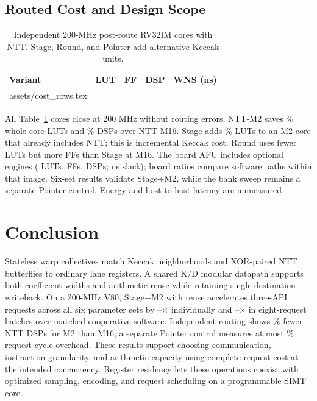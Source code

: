 \documentclass[conference,letterpaper]{IEEEtran}
\makeatletter
\newcommand{\tablerows}[1]{\@@input #1 }
\makeatother
\begin{document}
\subsection{Routed Cost and Design Scope}
\begin{table}[t]
\caption{Independent 200-MHz post-route RV32IM cores with NTT.
Stage, Round, and Pointer add alternative Keccak units.}
\label{tab:cost}
\centering\footnotesize\setlength{\tabcolsep}{3.4pt}
\begin{tabular}{@{}lrrrr@{}}
\toprule
Variant & LUT & FF & DSP & WNS (ns)\\
\midrule
\tablerows{assets/cost_rows.tex}
\bottomrule
\end{tabular}
\end{table}
All Table~\ref{tab:cost} cores close at 200 MHz without routing errors.
NTT-M2 saves \BankTwoCoreLutSaved{}\% whole-core LUTs and
\BankTwoCoreDspSaved{}\% DSPs over NTT-M16. Stage adds \JointStageLutPct{}\% LUTs
to an M2 core that already includes NTT; this is incremental Keccak cost.
Round uses fewer LUTs but more FFs than Stage at M16. The board AFU includes
optional engines (\BoardAfuLuts{} LUTs, \BoardAfuFfs{} FFs,
\BoardAfuDsps{} DSPs; \BoardWns{} ns slack); board ratios compare software
paths within that image. Six-set results validate Stage+M2, while the bank
sweep remains a separate Pointer control. Energy and host-to-host latency
are unmeasured.

\section{Conclusion}
Stateless warp collectives match Keccak neighborhoods and XOR-paired NTT
butterflies to ordinary lane registers. A shared K/D modular datapath
supports both coefficient widths and arithmetic reuse while retaining
single-destination writeback. On a 200-MHz V80, Stage+M2 with reuse accelerates
three-API requests across all six parameter sets by
\ParameterMinOne{}--\ParameterMaxOne{}$\times$ individually and
\ParameterMinEight{}--\ParameterMaxEight{}$\times$ in eight-request batches
over matched cooperative software. Independent routing shows
\BankTwoNttDspSaved{}\% fewer NTT DSPs for M2 than M16; a separate Pointer
control measures at most \BankTwoEndToEndMax{}\% request-cycle overhead.
These results support choosing communication, instruction granularity, and
arithmetic capacity using complete-request cost at the intended concurrency.
Register residency lets these operations coexist with optimized sampling,
encoding, and request scheduling on a programmable SIMT core.

\clearpage


\end{document}

